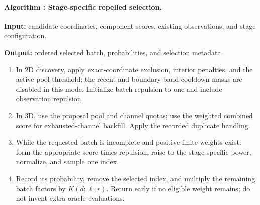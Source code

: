 \noindent\begin{minipage}{\textwidth}
\label{alg:batch}\paragraph{Algorithm \thealgorithm: Stage-specific repelled selection.}
\textbf{Input:} candidate coordinates, component scores, existing observations, and stage configuration.\par\textbf{Output:} ordered selected batch, probabilities, and selection metadata.
\begin{enumerate}
\item In 2D discovery, apply exact-coordinate exclusion, interior penalties, and the active-pool threshold; the recent and boundary-band cooldown masks are disabled in this mode. Initialize batch repulsion to one and include observation repulsion.
\item In 3D, use the proposal pool and channel quotas; use the weighted combined score for exhausted-channel backfill. Apply the recorded duplicate handling.
\item While the requested batch is incomplete and positive finite weights exist: form the appropriate score times repulsion, raise to the stage-specific power, normalize, and sample one index.
\item Record its probability, remove the selected index, and multiply the remaining batch factors by $K(d;\ell,r)$. Return early if no eligible weight remains; do not invent extra oracle evaluations.
\end{enumerate}
\end{minipage}\par


